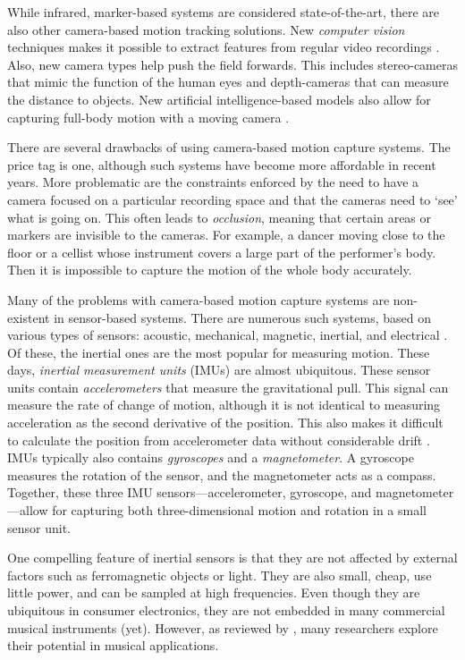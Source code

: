 While infrared, marker-based systems are considered state-of-the-art, there are also other camera-based motion tracking solutions. New \emph{computer vision} techniques makes it possible to extract features from regular video recordings \citep{moeslund_survey_2001,moeslund_survey_2006,rautaray_vision_2015}. Also, new camera types help push the field forwards. This includes stereo-cameras that mimic the function of the human eyes and depth-cameras that can measure the distance to objects. New artificial intelligence-based models also allow for capturing full-body motion with a moving camera \citep{voulodimos_deep_2018}.

There are several drawbacks of using camera-based motion capture systems. The price tag is one, although such systems have become more affordable in recent years. More problematic are the constraints enforced by the need to have a camera focused on a particular recording space and that the cameras need to `see' what is going on. This often leads to \emph{occlusion}, meaning that certain areas or markers are invisible to the cameras. For example, a dancer moving close to the floor or a cellist whose instrument covers a large part of the performer's body. Then it is impossible to capture the motion of the whole body accurately.

Many of the problems with camera-based motion capture systems are non-existent in sensor-based systems. There are numerous such systems, based on various types of sensors: acoustic, mechanical, magnetic, inertial, and electrical \citep{bishop_tracking_2001}. Of these, the inertial ones are the most popular for measuring motion. These days, \emph{inertial measurement units} (IMUs) are almost ubiquitous. These sensor units contain \emph{accelerometers} that measure the gravitational pull. This signal can measure the rate of change of motion, although it is not identical to measuring acceleration as the second derivative of the position. This also makes it difficult to calculate the position from accelerometer data without considerable drift \citep{skogstad_comparing_2011}.
IMUs typically also contains \emph{gyroscopes} and a \emph{magnetometer}. A gyroscope measures the rotation of the sensor, and the magnetometer acts as a compass. Together, these three IMU sensors---accelerometer, gyroscope, and magnetometer---allow for capturing both three-dimensional motion and rotation in a small sensor unit.

One compelling feature of inertial sensors is that they are not affected by external factors such as ferromagnetic objects or light. They are also small, cheap, use little power, and can be sampled at high frequencies. Even though they are ubiquitous in consumer electronics, they are not embedded in many commercial musical instruments (yet). However, as reviewed by \citet{medeiros_comprehensive_2014}, many researchers explore their potential in musical applications.


